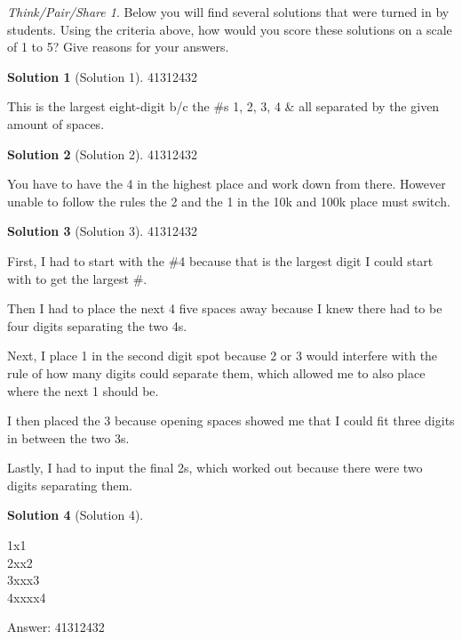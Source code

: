 \documentclass[10pt, reqno]{amsart}
\theoremstyle{remark}
\newtheorem*{thinkpair*}{Think/Pair/Share}
\theoremstyle{definition}
\newtheorem*{sol*}{Solution}
\numberwithin{equation}{section}  %
\begin{document}
\begin{thinkpair*}
Below you will find several solutions that were turned in by students.  Using the criteria above, how would you score these solutions on a scale of 1 to 5?  Give reasons for your answers.
\end{thinkpair*}

\begin{sol*}[Solution 1]
41312432


This is the largest eight-digit b/c  the \#s 1, 2, 3, 4 \& all separated by the given amount of spaces.

\end{sol*}


\begin{sol*}[Solution 2]
41312432


You have to have the 4 in the highest place and work down from there.  However unable to follow the rules the 2 and the 1 in the 10k and 100k place must switch.

\end{sol*}


\begin{sol*}[Solution 3]
41312432


First, I had to start with the \#4 because that is the largest digit I could start with to get the largest \#.



Then I had to place the next 4 five spaces away because I knew there had to be four digits separating the two 4s.


Next, I place 1 in the second digit spot because 2 or 3 would interfere with the rule of how many digits could separate them, which allowed me to also place where the next 1 should be.


I then placed the 3 because opening spaces showed me that I could fit three digits in between the two 3s.


Lastly, I had to input the final 2s, which worked out because there were two digits separating them.

\end{sol*}


\begin{sol*}[Solution 4]\ 

1x1\\

2xx2\\

3xxx3\\

4xxxx4



Answer: 41312432

\end{sol*}
\end{document}
